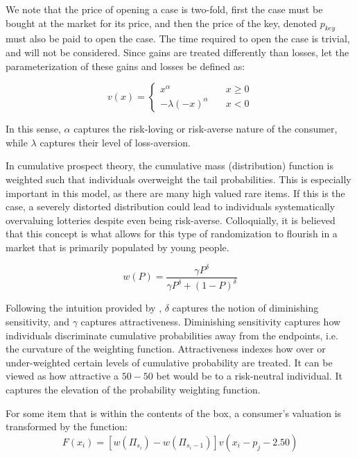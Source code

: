 \documentclass[12pt]{paper}
\newcommand{\brak}[1]{ \left [ #1 \right ] }
\begin{document}
We note that the price of opening a case is two-fold, first the case
must be bought at the market for its price, and then the price of the
key, denoted $p_{key}$ must also be paid to open the case. The time
required to open the case is trivial, and will not be
considered. Since gains are treated differently than losses, let the
parameterization of these gains and losses be defined as:

\begin{equation*}
  v(x) =
  \begin{cases}
    x^\alpha \quad &x \geq 0\\
    -\lambda(-x)^\alpha \quad &x < 0
  \end{cases}
\end{equation*}

In this sense, $\alpha$ captures the risk-loving or risk-averse nature of
the consumer, while $\lambda$ captures their level of loss-aversion.

In cumulative prospect theory, the cumulative mass (distribution)
function is weighted such that individuals overweight the tail
probabilities. This is especially important in this model, as there are
many high valued rare items. If this is the case, a severely distorted
distribution could lead to individuals systematically overvaluing
lotteries despite even being risk-averse. Colloquially, it is believed
that this concept is what allows for this type of randomization to
flourish in a market that is primarily populated by young people.

\begin{equation*}
  w(P) = \frac{ \gamma P^\delta }{ \gamma P^\delta + (1-P)^\delta }
\end{equation*}

Following the intuition provided by \cite{GONZALEZ1999129}, $\delta$
captures the notion of diminishing sensitivity,
and $\gamma$ captures attractiveness. Diminishing sensitivity captures how
individuals discriminate cumulative probabilities away from the
endpoints, i.e. the curvature of the weighting
function. Attractiveness indexes how over or under-weighted certain
levels of cumulative probability are treated. It can be viewed as how
attractive a $50-50$ bet would be to a risk-neutral individual. It
captures the elevation of the probability weighting function.


For some item that is within the contents of the box, a consumer's
valuation is transformed by the function:
\begin{equation*}
F(x_i) = \brak{w( \Pi_{s_i}) - w(\Pi_{s_i - 1}) } v( x_i - p_j - 2.50)
\end{equation*}
\end{document}
